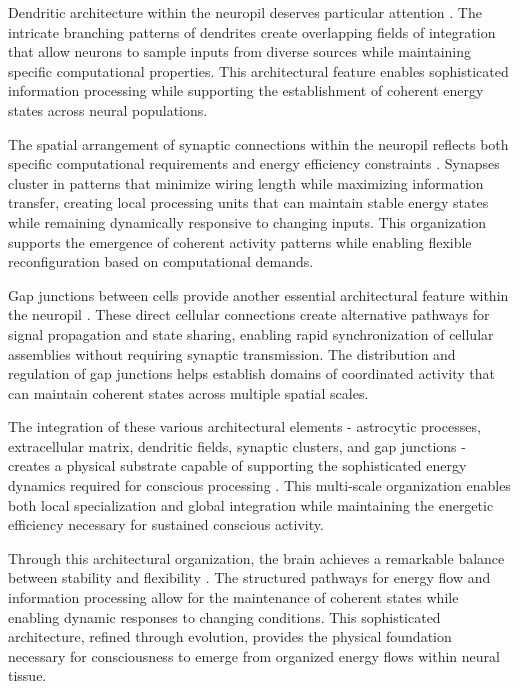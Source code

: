 Dendritic architecture within the neuropil deserves particular attention \cite{Rockland2020}. The intricate branching patterns of dendrites create overlapping fields of integration that allow neurons to sample inputs from diverse sources while maintaining specific computational properties. This architectural feature enables sophisticated information processing while supporting the establishment of coherent energy states across neural populations.

The spatial arrangement of synaptic connections within the neuropil reflects both specific computational requirements and energy efficiency constraints \cite{Markram2015}. Synapses cluster in patterns that minimize wiring length while maximizing information transfer, creating local processing units that can maintain stable energy states while remaining dynamically responsive to changing inputs. This organization supports the emergence of coherent activity patterns while enabling flexible reconfiguration based on computational demands.

Gap junctions between cells provide another essential architectural feature within the neuropil \cite{Zeng2017}. These direct cellular connections create alternative pathways for signal propagation and state sharing, enabling rapid synchronization of cellular assemblies without requiring synaptic transmission. The distribution and regulation of gap junctions helps establish domains of coordinated activity that can maintain coherent states across multiple spatial scales.

The integration of these various architectural elements - astrocytic processes, extracellular matrix, dendritic fields, synaptic clusters, and gap junctions - creates a physical substrate capable of supporting the sophisticated energy dynamics required for conscious processing \cite{Bassett2017}. This multi-scale organization enables both local specialization and global integration while maintaining the energetic efficiency necessary for sustained conscious activity.

Through this architectural organization, the brain achieves a remarkable balance between stability and flexibility \cite{Buzsaki2006}. The structured pathways for energy flow and information processing allow for the maintenance of coherent states while enabling dynamic responses to changing conditions. This sophisticated architecture, refined through evolution, provides the physical foundation necessary for consciousness to emerge from organized energy flows within neural tissue.

